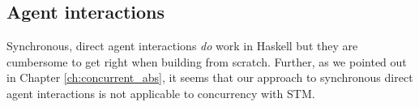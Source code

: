 
\subsection{Agent interactions}
Synchronous, direct agent interactions \textit{do} work in Haskell but they are cumbersome to get right when building from scratch. Further, as we pointed out in Chapter \ref{ch:concurrent_abs}, it seems that our approach to synchronous direct agent interactions is not applicable to concurrency with STM. 

